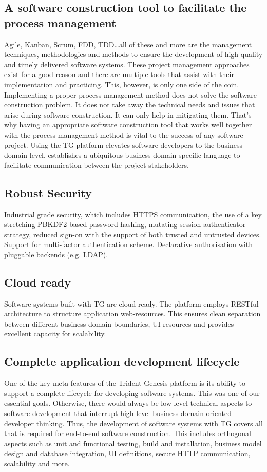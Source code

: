 \documentclass[a4paper,10pt,oneside,openright,final]{memoir} %
\begin{document}
	
\subsection*{A software construction tool to facilitate the process management}
	Agile, Kanban, Scrum, FDD, TDD\ldots all of these and more are the management techniques, methodologies and methods to ensure the development of high quality and timely delivered software systems.
	These project management approaches exist for a good reason and there are multiple tools that assist with their implementation and practicing.
	This, however, is only one side of the coin.
	Implementing a proper process management method does not solve the software construction problem.
	It does not take away the technical needs and issues that arise during software construction.
	It can only help in mitigating them.
	That's why having an appropriate software construction tool that works well together with the process management method is vital to the success of any software project.
	Using the TG platform elevates software developers to the business domain level, establishes a ubiquitous business domain specific language to facilitate communication between the project stakeholders.


\subsection*{Robust Security}
	Industrial grade security, which includes HTTPS communication, the use of a key stretching PBKDF2 based password hashing, mutating session authenticator strategy, reduced sign-on with the support of both trusted and untrusted devices. 
	Support for multi-factor authentication scheme. 
	Declarative authorisation with pluggable backends (e.g. LDAP).

    
    
\subsection*{Cloud ready}
	Software systems built with TG are cloud ready.
	The platform employs RESTful architecture to structure application web-resources.
	This ensures clean separation between different business domain boundaries, UI resources and provides excellent capacity for scalability.

\subsection*{Complete application development lifecycle}
	One of the key meta-features of the Trident Genesis platform is its ability to support a complete lifecycle for developing software systems.
	This was one of our essential goals.
	Otherwise, there would always be low level technical aspects to software development that interrupt high level business domain oriented developer thinking.
	Thus, the development of software systems with TG covers all that is required for end-to-end software construction.
	This includes orthogonal aspects such as unit and functional testing, build and installation, business model design and database integration, UI definitions, secure HTTP communication, scalability and more.
\end{document}
